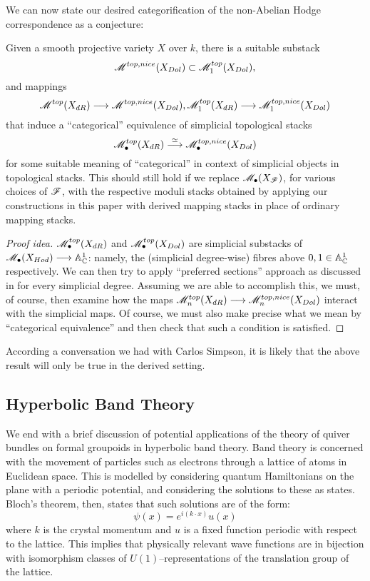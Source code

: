 \documentclass[11pt]{amsart}
\begin{document}
We can now state our desired categorification of the non-Abelian Hodge
correspondence as a conjecture:

\begin{cnj}
Given a smooth projective variety $X$ over $k$, there is a suitable substack
\[
\mathscr{M}^{top, nice}(X_{Dol}) \subset \mathscr{M}_1^{top}(X_{Dol}),
\]
and mappings
\[
\sM^{top}(X_{dR}) \to \sM^{top, nice}(X_{Dol}),
\sM_1^{top}(X_{dR}) \to \sM_1^{top, nice}(X_{Dol})
\]
that induce a ``categorical'' equivalence of simplicial topological stacks
\[
\sM^{top}_{\bullet}(X_{dR}) \to[\simeq] \sM^{top, nice}_{\bullet}(X_{Dol})
\]
for some suitable meaning of ``categorical'' in context of simplicial objects
in topological stacks. This should still hold if we
replace $\mathscr{M}_\bullet(X_{\mathscr{F}})$, for various choices of $\mathscr{F}$, with
the respective moduli stacks obtained by applying our constructions
in this paper with derived mapping stacks in place of ordinary mapping stacks.
\end{cnj}
\begin{proof}[Proof idea]
$\mathscr{M}_\bullet^{top}(X_{dR})$
and $\mathscr{M}_\bullet^{top}(X_{Dol})$ are simplicial substacks of
$\sM_\bullet(X_{Hod}) \to \bA^1_\bC$: namely, the (simplicial degree-wise)
fibres above $0, 1 \in \mathbb{A}^1_\mathbb{C}$ respectively. We can then try to apply
``preferred sections'' approach as discussed in \cite[\S 4]{NonAbHodgeFilt}
for every simplicial degree. Assuming we are able to accomplish this,
we must, of course, then examine how the maps
$\sM_n^{top}(X_{dR}) \to \sM_n^{top, nice}(X_{Dol})$ interact with the
simplicial maps. Of course, we must also make precise what we mean by
``categorical equivalence'' and then check that such a condition is satisfied.
\end{proof}

\begin{rmk}
According a conversation we had with Carlos Simpson, it is likely that the above
result will only be true in the derived setting.
\end{rmk}

\subsection{Hyperbolic Band Theory}

We end with a brief discussion of potential applications of the theory of quiver
bundles on formal groupoids in hyperbolic band theory.
Band theory is concerned with the movement of particles such
as electrons through a lattice of atoms in Euclidean space. This is modelled
by considering quantum Hamiltonians on the plane with a periodic potential, and
considering the solutions to these as states. Bloch's theorem, then, states that
such solutions are of the form:
\[
\psi(x) = e^{i(k \cdot x)}u(x)
\]
where $k$ is the crystal momentum and
$u$ is a fixed function periodic with respect to the lattice.
This implies that physically relevant wave functions
are in bijection with isomorphism classes of $U(1)$--representations of the
translation group of the lattice.
\end{document}
